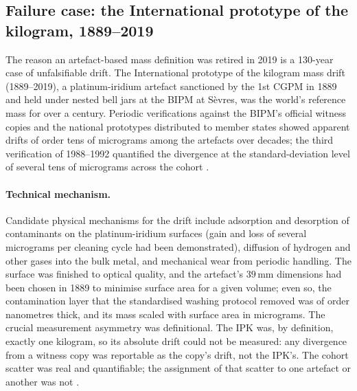 \subsection{Failure case: the International prototype of the
kilogram, 1889--2019}

The reason an artefact-based mass definition was retired in 2019 is
a 130-year case of unfalsifiable drift. The International prototype
of the kilogram mass drift (1889--2019), a platinum-iridium artefact
sanctioned by the 1st CGPM in 1889 and held under nested bell jars
at the BIPM at S{\`e}vres, was the world's reference mass for over
a century. Periodic verifications against the BIPM's official
witness copies and the national prototypes distributed to member
states showed apparent drifts of order tens of micrograms among the
artefacts over decades; the third verification of 1988--1992
quantified the divergence at the standard-deviation level of several
tens of micrograms across the cohort \cite{paper:girard-ipk-1994,%
web:bipm-kilogram-history}.

\paragraph{Technical mechanism.}
Candidate physical mechanisms for the drift include adsorption and
desorption of contaminants on the platinum-iridium surfaces (gain
and loss of several micrograms per cleaning cycle had been
demonstrated), diffusion of hydrogen and other gases into the bulk
metal, and mechanical wear from periodic handling. The surface was
finished to optical quality, and the artefact's $39 \,\si
{\milli\meter}$ dimensions had been chosen in 1889 to minimise
surface area for a given volume; even so, the contamination layer
that the standardised washing protocol removed was of order
nanometres thick, and its mass scaled with surface area in
micrograms. The crucial measurement asymmetry was definitional. The
IPK was, by definition, exactly one kilogram, so its absolute drift
could not be measured: any divergence from a witness copy was
reportable as the copy's drift, not the IPK's. The cohort scatter
was real and quantifiable; the assignment of that scatter to one
artefact or another was not \cite{paper:girard-ipk-1994}.


